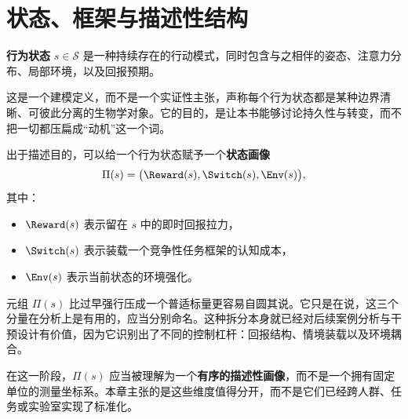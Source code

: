 \section{状态、框架与描述性结构}

\begin{definition}[行为状态]
\textbf{行为状态} $s \in \mathcal{S}$ 是一种持续存在的行动模式，同时包含与之相伴的姿态、注意力分布、局部环境，以及回报预期。
\end{definition}

\begin{remark}
这是一个建模定义，而不是一个实证性主张，声称每个行为状态都是某种边界清晰、可彼此分离的生物学对象。它的目的，是让本书能够讨论持久性与转变，而不把一切都压扁成“动机”这一个词。
\end{remark}

\begin{definition}[状态画像]
出于描述目的，可以给一个行为状态赋予一个\textbf{状态画像}
\[
  \Pi(s) = \bigl(\Reward(s), \Switch(s), \Env(s)\bigr),
\]
其中：
\begin{itemize}[nosep]
  \item $\Reward(s)$ 表示留在 $s$ 中的即时回报拉力，
  \item $\Switch(s)$ 表示装载一个竞争性任务框架的认知成本，
  \item $\Env(s)$ 表示当前状态的环境强化。
\end{itemize}
\end{definition}

\begin{discussion}
元组 $\Pi(s)$ 比过早强行压成一个普适标量更容易自圆其说。它只是在说，这三个分量在分析上是有用的，应当分别命名。这种拆分本身就已经对后续案例分析与干预设计有价值，因为它识别出了不同的控制杠杆：回报结构、情境装载以及环境耦合。
\end{discussion}

\begin{remark}
在这一阶段，$\Pi(s)$ 应当被理解为一个\textbf{有序的描述性画像}，而不是一个拥有固定单位的测量坐标系。本章主张的是这些维度值得分开，而不是它们已经跨人群、任务或实验室实现了标准化。
\end{remark}